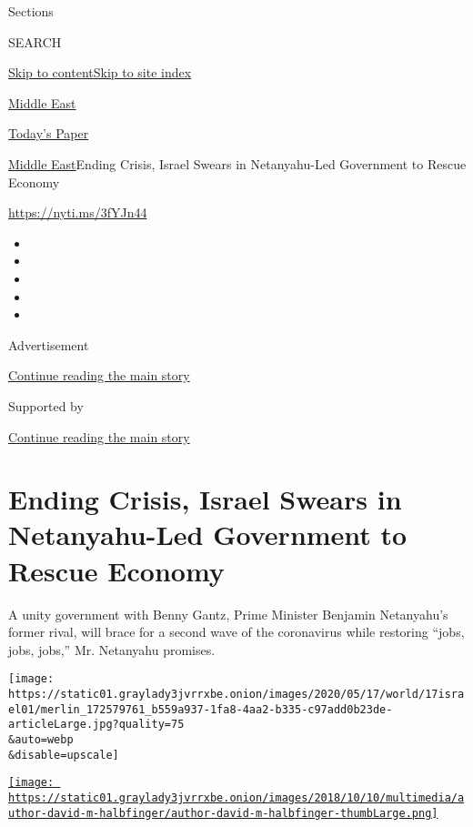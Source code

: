 Sections

SEARCH

\protect\hyperlink{site-content}{Skip to
content}\protect\hyperlink{site-index}{Skip to site index}

\href{https://www.nytimes3xbfgragh.onion/section/world/middleeast}{Middle
East}

\href{https://myaccount.nytimes3xbfgragh.onion/auth/login?response_type=cookie\&client_id=vi}{}

\href{https://www.nytimes3xbfgragh.onion/section/todayspaper}{Today's
Paper}

\href{/section/world/middleeast}{Middle East}\textbar{}Ending Crisis,
Israel Swears in Netanyahu-Led Government to Rescue Economy

\url{https://nyti.ms/3fYJn44}

\begin{itemize}
\item
\item
\item
\item
\item
\end{itemize}

Advertisement

\protect\hyperlink{after-top}{Continue reading the main story}

Supported by

\protect\hyperlink{after-sponsor}{Continue reading the main story}

\hypertarget{ending-crisis-israel-swears-in-netanyahu-led-government-to-rescue-economy}{%
\section{Ending Crisis, Israel Swears in Netanyahu-Led Government to
Rescue
Economy}\label{ending-crisis-israel-swears-in-netanyahu-led-government-to-rescue-economy}}

A unity government with Benny Gantz, Prime Minister Benjamin Netanyahu's
former rival, will brace for a second wave of the coronavirus while
restoring ``jobs, jobs, jobs,'' Mr. Netanyahu promises.

\texttt{[image: https://static01.graylady3jvrrxbe.onion/images/2020/05/17/world/17israel01/merlin\_172579761\_b559a937-1fa8-4aa2-b335-c97add0b23de-articleLarge.jpg?quality=75\\\&auto=webp\\\&disable=upscale]}

\href{https://www.nytimes3xbfgragh.onion/by/david-m-halbfinger}{\texttt{[image: https://static01.graylady3jvrrxbe.onion/images/2018/10/10/multimedia/author-david-m-halbfinger/author-david-m-halbfinger-thumbLarge.png]}}


